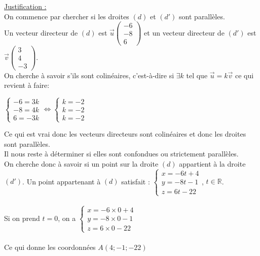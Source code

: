 \documentclass[a4paper, 12pt]{article}
\begin{document}
\noindent
\underline{Justification :}
\\
On commence par chercher si les droites $(d)$ et $(d')$ sont parallèles. 
\\[0.5mm]
Un vecteur directeur de $(d)$ est $\vec{u} \begin{pmatrix} -6 \\ -8 \\ 6 \end{pmatrix}$ et un vecteur directeur de $(d')$ est $\vec{v} \begin{pmatrix} 3 \\ 4 \\ -3 \end{pmatrix}$.
\\[4mm]
On cherche à savoir s'ils sont colinéaires, c'est-à-dire si $\exists k$ tel que $ \vec{u} = k\vec{v}$ ce qui revient à faire:
\begin{center}
$\begin{cases} -6 = 3k \\ -8 = 4k \\ 6 = -3k \end{cases} \iff \begin{cases} k = -2 \\ k = -2 \\ k = -2 \end{cases}$
\end{center}
Ce qui est vrai donc les vecteurs directeurs sont colinéaires et donc les droites sont parallèles. 
\\
Il nous reste à déterminer si elles sont confondues ou strictement parallèles.
\\
On cherche donc à savoir si un point sur la droite $(d)$ appartient à la droite $(d')$. Un point appartenant à $(d)$ satisfait : 
$ \begin{cases} x = -6t + 4 \\ y = -8t - 1 \\ z = 6t - 22 \end{cases}$, $t \in \mathbb{R}$. 
\\ \\
Si on prend $t = 0$, on a $\begin{cases} x = -6 \times 0 + 4 \\ y = -8 \times 0 - 1 \\ z = 6 \times 0 -22 \end{cases}$ 
\\ \\ 
Ce qui donne les coordonnées $A(4; -1; -22)$ 
\\
\end{document}
